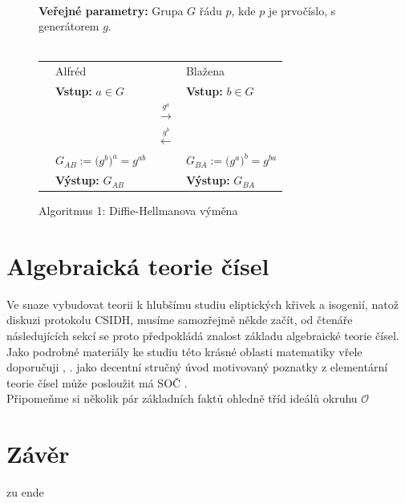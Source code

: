 \documentclass [12pt]{report}
\begin{document}
\begin{figure}[h]
\begin{center} 
\makebox[1cm]{\rule{15cm}{0.4pt}}\\
\hspace{-1.35cm} \textbf{Veřejné parametry:} Grupa $G$ řádu $p$, kde $p$ je prvočíslo, s generátorem $g$.\\

\vspace{-0.25cm}
\makebox[\linewidth]{\rule{15cm}{0.4pt}}\\
\vspace{0.2cm}
\begin{tabular}{l l c l}
\cline{2-2} \cline{4-4} 
& Alfréd & & Blažena \\ 
\cline{2-2} \cline{4-4} 
& \textbf{Vstup:} $a \in G$ & & \textbf{Vstup:} $b \in G$ \\
 & & $\stackrel{g^a}{\longrightarrow} $ &  \\
&  & $\stackrel{g^b}{\longleftarrow} $ &  \\
& $G_{AB} := \big(g^b\big)^{a} = g^{ab}$ &  & $ G_{BA} := \big(g^a\big)^{b} = g^{ba}$ \\
& \textbf{Výstup:} $G_{AB}$ & & \textbf{Výstup:} $G_{BA}$
\end{tabular}
\caption*{Algoritmus 1: Diffie-Hellmanova výměna}
\vspace{-0.8cm}
\end{center}
\end{figure}

\chapter{Algebraická teorie čísel}

Ve snaze vybudovat teorii k hlubšímu studiu eliptických křivek a isogenií, natož diskuzi protokolu CSIDH, musíme samozřejmě někde začít, od čtenáře následujících sekcí se proto předpokládá znalost základu algebraické teorie čísel. Jako podrobné materiály ke studiu této krásné oblasti matematiky vřele doporučuji \cite{Marcus}, \cite{Rosicky}. jako decentní stručný úvod motivovaný poznatky z elementární teorie čísel může posloužit má SOČ \cite[kap. 2]{Pezlar}.\\

Připomeňme si několik pár základních faktů ohledně tříd ideálů okruhu $\mathcal{O}$ 
 

\chapter*{Závěr}
zu ende
\end{document}
